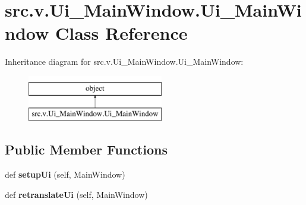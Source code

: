 \hypertarget{classsrc_1_1v_1_1_ui___main_window_1_1_ui___main_window}{}\section{src.\+v.\+Ui\+\_\+\+Main\+Window.\+Ui\+\_\+\+Main\+Window Class Reference}
\label{classsrc_1_1v_1_1_ui___main_window_1_1_ui___main_window}
Inheritance diagram for src.\+v.\+Ui\+\_\+\+Main\+Window.\+Ui\+\_\+\+Main\+Window\+:\begin{figure}[H]
\begin{center}
\leavevmode
\includegraphics[height=2.000000cm]{classsrc_1_1v_1_1_ui___main_window_1_1_ui___main_window}
\end{center}
\end{figure}
\subsection*{Public Member Functions}
\begin{DoxyCompactItemize}
\item 
\hypertarget{classsrc_1_1v_1_1_ui___main_window_1_1_ui___main_window_a6916457b6d2facc5418d755ec4132ea0}{}def {\bfseries setup\+Ui} (self, Main\+Window)\label{classsrc_1_1v_1_1_ui___main_window_1_1_ui___main_window_a6916457b6d2facc5418d755ec4132ea0}

\item 
\hypertarget{classsrc_1_1v_1_1_ui___main_window_1_1_ui___main_window_a5095ff4af2a68e53390a63a2bf3e6aeb}{}def {\bfseries retranslate\+Ui} (self, Main\+Window)\label{classsrc_1_1v_1_1_ui___main_window_1_1_ui___main_window_a5095ff4af2a68e53390a63a2bf3e6aeb}

\end{DoxyCompactItemize}
